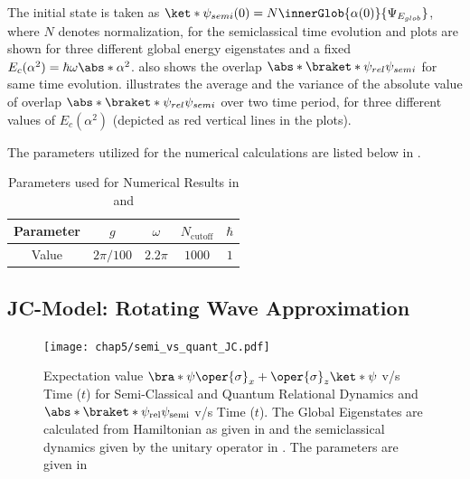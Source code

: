 The initial state is taken as \(\ket*{\psi_{semi}(0)} = N\innerGlob{\alpha(0)}{\Psi_{E_{glob}}}\), where $N$ denotes normalization, for the semiclassical time evolution and plots are shown 
for three different global energy eigenstates and a fixed \(E_c(\alpha^2) = \hbar \omega \abs*{\alpha}^2\).  also shows the overlap \(\abs*{\braket*{\psi_{rel}}{\psi_{semi}}}\)
for same time evolution.  illustrates the average and the 
variance of the absolute value of overlap \(\abs*{\braket*{\psi_{rel}}{\psi_{semi}}}\) over two time period, 
for three different values of \(E_c(\alpha^2)\) (depicted as red vertical lines in the plots). 

The parameters utilized for the numerical calculations are listed below in .
\begin{table}[!ht]
    \centering
        \begin{tabular}{|c|c|c|c|c|}
            \hline
            Parameter & $g$ & $\omega$ & $N_{\text{cutoff}}$ & $\hbar$ \\
            \hline
            Value & $2\pi/100$ & $2.2\pi$ & $1000$ & $1$ \\
            \hline
        \end{tabular}
    \caption{Parameters used for Numerical Results in  and 
    }
    \label{tab:numerical_values_linear}
\end{table}





\subsection*{JC-Model: Rotating Wave Approximation}
\begin{figure}[!h]
    \centering
    \texttt{[image: chap5/semi\_vs\_quant\_JC.pdf]}
    \caption{
    Expectation value
        \(\bra*{\psi} \oper{\sigma}_x + \oper{\sigma}_z \ket*{\psi}\) v/s Time ($t$) for Semi-Classical and Quantum Relational Dynamics
    and \(\abs*{\braket*{\psi_{\mathrm{rel}}}{\psi_{\mathrm{semi}}}}\) v/s Time ($t$). The Global Eigenstates are calculated from 
    Hamiltonian as given in  and the semiclassical dynamics given by the unitary operator in . The parameters 
    are given in 
    }
    \label{fig:chap5_JCM_semi_vs_quant}
\end{figure}


